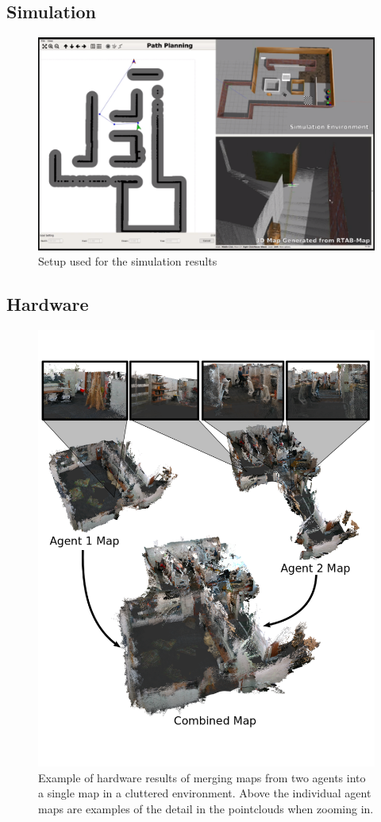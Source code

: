 \documentclass[letterpaper, 10 pt, conference]{ieeeconf}  %
\begin{document}
\subsection{Simulation}

\begin{figure}
\centering
\includegraphics[width=1.0\linewidth]{sim_setup}
\caption{Setup used for the simulation results}
\label{fig:sim_setup}
\end{figure}

\subsection{Hardware}

\begin{figure}
\centering
\includegraphics[width=0.9\linewidth]{lab_map.png}
\caption{Example of hardware results of merging maps from two agents into a single map in a cluttered environment. Above the individual agent maps are examples of the detail in the pointclouds when zooming in.}
\label{fig:lab_map}
\end{figure}
\end{document}
